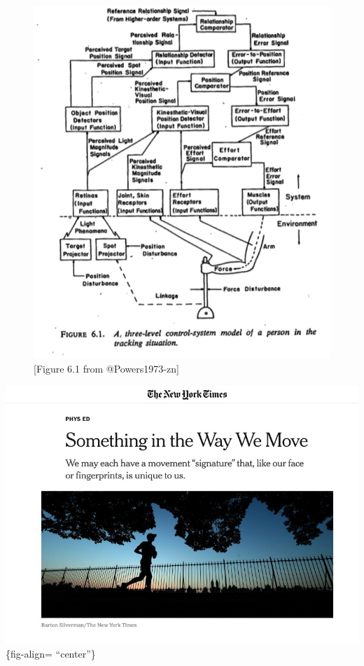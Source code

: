 \documentclass[
  letterpaper,
  DIV=11,
  numbers=noendperiod]{scrartcl}
\begin{document}
\begin{figure}[H]

{\centering \includegraphics{../include/img/powers-6.1.png}

}

\caption{{[}Figure 6.1 from @Powers1973-zn{]}}

\end{figure}%

\includegraphics{../include/img/something-in-the-way-we-move.jpg}\{fig-align=
``center''\}
\end{document}
